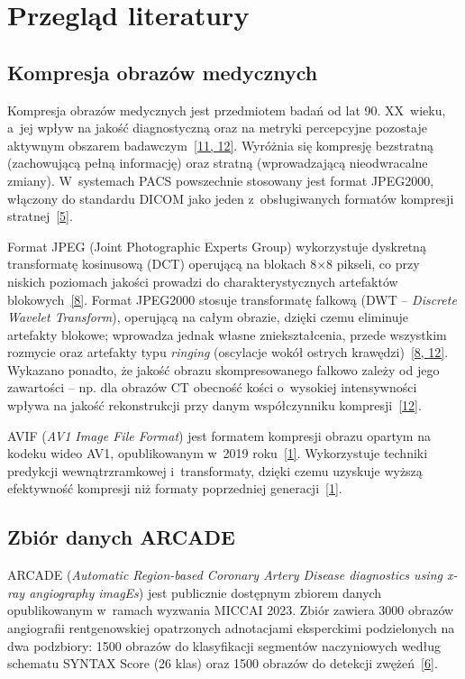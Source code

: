 \documentclass[12pt,a4paper]{article}
\newcommand{\mycite}[1]{\hyperlink{bib#1}{[#1]}}
\begin{document}
\clearpage
\section{Przegląd literatury}
\label{sec:literatura}

\subsection{Kompresja obrazów medycznych}

Kompresja obrazów medycznych jest przedmiotem badań od lat 90. XX~wieku, a~jej wpływ na jakość diagnostyczną oraz na metryki percepcyjne pozostaje aktywnym obszarem badawczym~\mycite{11, 12}. Wyróżnia się kompresję bezstratną (zachowującą pełną informację) oraz stratną (wprowadzającą nieodwracalne zmiany). W~systemach PACS powszechnie stosowany jest format JPEG2000, włączony do standardu DICOM jako jeden z~obsługiwanych formatów kompresji stratnej~\mycite{5}.

Format JPEG (Joint Photographic Experts Group) wykorzystuje dyskretną transformatę kosinusową (DCT) operującą na blokach 8$\times$8 pikseli, co przy niskich poziomach jakości prowadzi do charakterystycznych artefaktów blokowych~\mycite{8}. Format JPEG2000 stosuje transformatę falkową (DWT -- \textit{Discrete Wavelet Transform}), operującą na całym obrazie, dzięki czemu eliminuje artefakty blokowe; wprowadza jednak własne zniekształcenia, przede wszystkim rozmycie oraz artefakty typu \textit{ringing} (oscylacje wokół ostrych krawędzi)~\mycite{8, 12}. Wykazano ponadto, że jakość obrazu skompresowanego falkowo zależy od jego zawartości -- np. dla obrazów CT obecność kości o~wysokiej intensywności wpływa na jakość rekonstrukcji przy danym współczynniku kompresji~\mycite{12}.

AVIF (\textit{AV1 Image File Format}) jest formatem kompresji obrazu opartym na kodeku wideo AV1, opublikowanym w~2019 roku~\mycite{1}. Wykorzystuje techniki predykcji wewnątrzramkowej i~transformaty, dzięki czemu uzyskuje wyższą efektywność kompresji niż formaty poprzedniej generacji~\mycite{1}.

\subsection{Zbiór danych ARCADE}

ARCADE (\textit{Automatic Region-based Coronary Artery Disease diagnostics using x-ray angiography imagEs}) jest publicznie dostępnym zbiorem danych opublikowanym w~ramach wyzwania MICCAI 2023. Zbiór zawiera 3000 obrazów angiografii rentgenowskiej opatrzonych adnotacjami eksperckimi podzielonych na dwa podzbiory: 1500 obrazów do klasyfikacji segmentów naczyniowych według schematu SYNTAX Score (26 klas) oraz 1500 obrazów do detekcji zwężeń~\mycite{6}.
\end{document}
